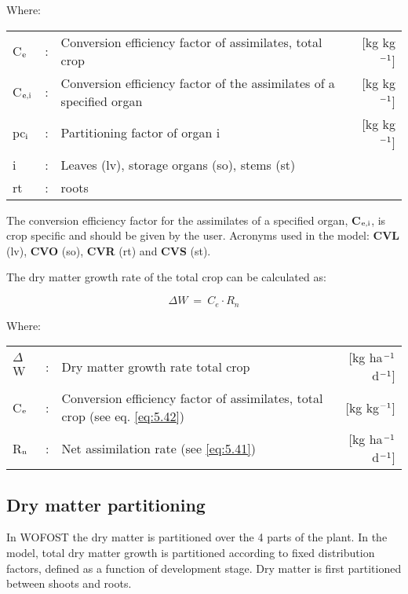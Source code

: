Where:\\[5pt]
\begin{tabularx}{\textwidth}{llXr}
	C$_{{\rm e}}$ &:& Conversion efficiency factor of assimilates, total crop  &   
	[kg kg$^{{\rm -1}}$]\\
	C$_{{\rm e,i}}$ &:& Conversion efficiency factor of the assimilates 
	of a specified organ  &      [kg kg$^{{\rm -1}}$]\\
	pc$_{{\rm i}}$ &:& Partitioning factor of organ i   &
	[kg kg$^{{\rm -1}}$]\\
	i &:& Leaves (lv), storage organs (so), stems (st)\\
	rt &:& roots\\
\end{tabularx}

The conversion efficiency factor for the assimilates of a specified organ, {\bf C$_{{\rm e,i}}$}, is crop
specific and should be given by the user. Acronyms used in the model: {\bf CVL} (lv), {\bf CVO}
(so), {\bf CVR} (rt) and {\bf CVS} (st).

The dry matter growth rate of the total crop can be calculated as:

\begin{equation}
\Delta W~=~ C_{e} \cdot R_{n} 
\end{equation}

Where:\\[5pt]
\begin{tabularx}{\textwidth}{llXr}
	$\Delta$W &:& Dry matter growth rate total crop   &
	[kg ha$^{{\rm -1}}$ d$^{{\rm -1}}$]\\
	C$_{{\rm e}}$ &:& Conversion efficiency factor of assimilates,
	total crop (see eq. \ref{eq:5.42})    &    [kg kg$^{{\rm -1}}$] \\
	R$_{{\rm n}}$ &:& Net assimilation rate (see \ref{eq:5.41})   &
	[kg ha$^{{\rm -1}}$ d$^{{\rm -1}}$]\\
\end{tabularx}

\subsection{Dry matter partitioning}
\label{sec:DMpartitioning}

In WOFOST the dry matter is partitioned over the 4 parts of the
plant. In the model, total dry matter growth is partitioned according to fixed distribution
factors, defined as a function of development stage. Dry matter is first partitioned
between shoots and roots. 

